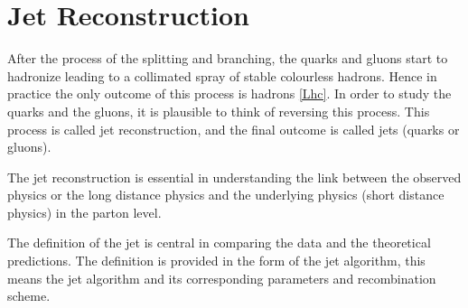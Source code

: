 \chapter{Jet Reconstruction}\label{chapter4}

After the process of the splitting and branching, the quarks and gluons start to hadronize leading to a collimated spray of stable colourless hadrons. Hence in practice
the only outcome of this process is hadrons \ref{Lhc}. In order to study the quarks and the gluons, it is plausible to think of reversing this process. This process is called jet reconstruction, and the final outcome is called jets (quarks or gluons).     

The jet reconstruction is essential in understanding the link between the observed physics or the long distance physics and the underlying physics (short distance physics) in the parton level.

The definition of the jet is central in comparing the data and the theoretical predictions. The definition is provided in the form of the jet algorithm, this means the jet algorithm and its corresponding parameters and recombination scheme.






